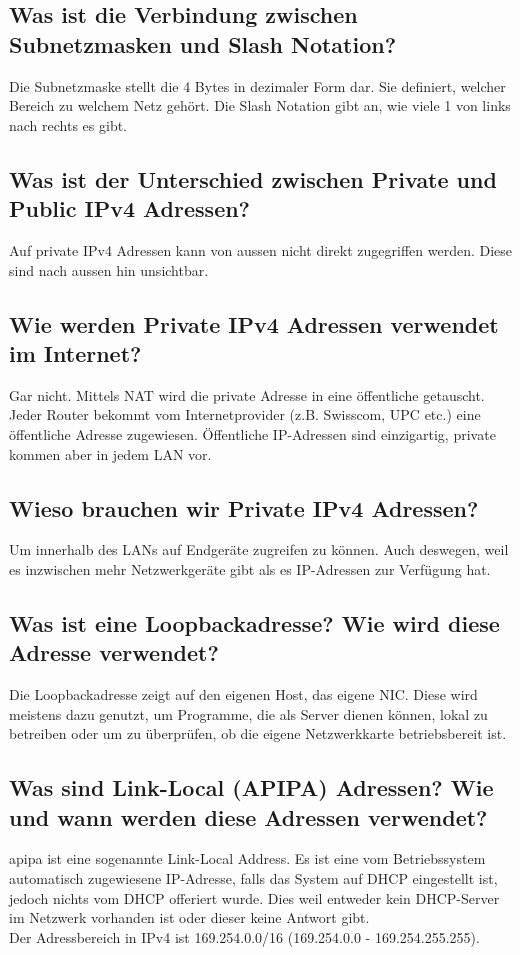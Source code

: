 \subsection*{Was ist die Verbindung zwischen Subnetzmasken und \flqq Slash Notation\frqq{}?}
Die Subnetzmaske stellt die 4 Bytes in dezimaler Form dar. Sie definiert, welcher Bereich zu welchem Netz gehört. Die Slash Notation gibt an, wie viele 1 von links nach rechts es gibt. 

\subsection*{Was ist der Unterschied zwischen Private und Public IPv4 Adressen?}\label{sub:private_public_IP}
Auf private IPv4 Adressen kann von aussen nicht direkt zugegriffen werden. Diese sind nach aussen hin unsichtbar.

\subsection*{Wie werden Private IPv4 Adressen verwendet im Internet?}
Gar nicht. Mittels NAT wird die private Adresse in eine öffentliche getauscht. Jeder Router bekommt vom Internetprovider (z.B. Swisscom, UPC etc.) eine öffentliche Adresse zugewiesen. Öffentliche IP-Adressen sind einzigartig, private kommen aber in jedem LAN vor.

\subsection*{Wieso brauchen wir Private IPv4 Adressen?}
Um innerhalb des LANs auf Endgeräte zugreifen zu können. Auch deswegen, weil es inzwischen mehr Netzwerkgeräte gibt als es IP-Adressen zur Verfügung hat.

\subsection*{Was ist eine Loopbackadresse? Wie wird diese Adresse verwendet?}
Die Loopbackadresse zeigt auf den eigenen Host, das eigene NIC. Diese wird meistens dazu genutzt, um Programme, die als Server dienen können, lokal zu betreiben oder um zu überprüfen, ob die eigene Netzwerkkarte betriebsbereit ist.

\subsection*{Was sind \flqq Link-Local\frqq{} (APIPA) Adressen? Wie und wann werden diese Adressen verwendet?}\label{sub:APIPA}
\acrfull{apipa} ist eine sogenannte Link-Local Address. Es ist eine vom Betriebssystem automatisch zugewiesene IP-Adresse, falls das System auf DHCP eingestellt ist, jedoch nichts vom DHCP offeriert wurde. Dies weil entweder kein DHCP-Server im Netzwerk vorhanden ist oder dieser keine Antwort gibt.\\Der Adressbereich in IPv4 ist 169.254.0.0/16 (169.254.0.0 - 169.254.255.255).

